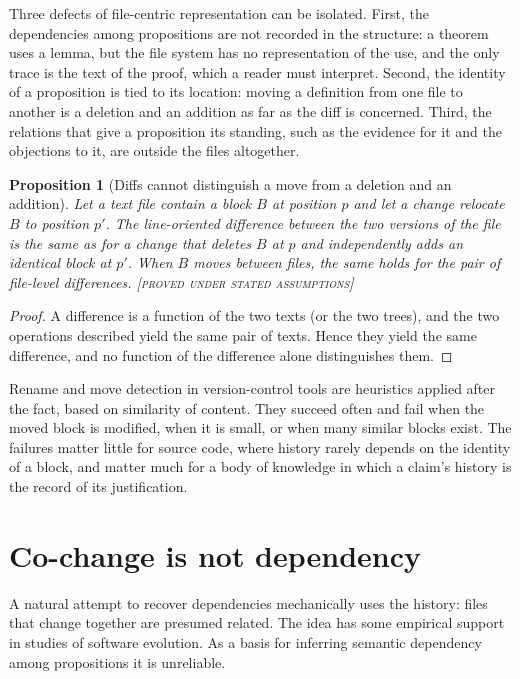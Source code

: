 \documentclass[11pt,twoside,openright]{book}
\theoremstyle{plain}
\newtheorem{proposition}[theorem]{Proposition}
\theoremstyle{definition}
\theoremstyle{remark}
\newcommand{\Proved}{\textup{\textsc{[proved under stated assumptions]}}}
\begin{document}
Three defects of file-centric representation can be isolated. First, the dependencies among propositions are not recorded in the structure: a theorem uses a lemma, but the file system has no representation of the use, and the only trace is the text of the proof, which a reader must interpret. Second, the identity of a proposition is tied to its location: moving a definition from one file to another is a deletion and an addition as far as the diff is concerned. Third, the relations that give a proposition its standing, such as the evidence for it and the objections to it, are outside the files altogether.

\begin{proposition}[Diffs cannot distinguish a move from a deletion and an addition]\label{prop:moves}
Let a text file contain a block $B$ at position $p$ and let a change relocate $B$ to position $p'$. The line-oriented difference between the two versions of the file is the same as for a change that deletes $B$ at $p$ and independently adds an identical block at $p'$. When $B$ moves between files, the same holds for the pair of file-level differences.
\Proved{}
\end{proposition}

\begin{proof}
A difference is a function of the two texts (or the two trees), and the two operations described yield the same pair of texts. Hence they yield the same difference, and no function of the difference alone distinguishes them.
\end{proof}

Rename and move detection in version-control tools are heuristics applied after the fact, based on similarity of content. They succeed often and fail when the moved block is modified, when it is small, or when many similar blocks exist. The failures matter little for source code, where history rarely depends on the identity of a block, and matter much for a body of knowledge in which a claim's history is the record of its justification.

\section{Co-change is not dependency}

A natural attempt to recover dependencies mechanically uses the history: files that change together are presumed related. The idea has some empirical support in studies of software evolution. As a basis for inferring semantic dependency among propositions it is unreliable.
\end{document}
